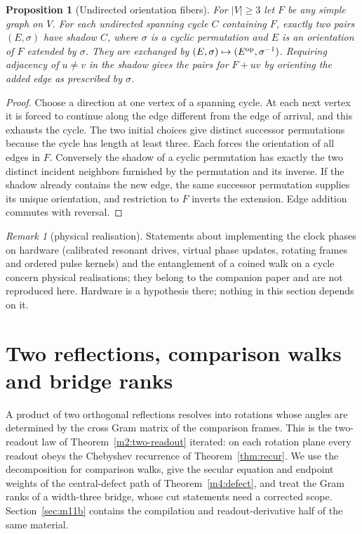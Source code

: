 \documentclass[11pt,reqno]{amsart}
\newtheorem{proposition}[theorem]{Proposition}
\theoremstyle{definition}
\theoremstyle{remark}
\newtheorem{remark}[theorem]{Remark}
\numberwithin{equation}{section}
\begin{document}
\begin{proposition}[Undirected orientation fibers]\label{m4:orientation}
For $|V|\ge3$ let $F$ be any simple graph on $V$. For each undirected spanning cycle $C$ containing $F$, exactly two pairs $(E,\sigma)$ have shadow $C$, where $\sigma$ is a cyclic permutation and $E$ is an orientation of $F$ extended by $\sigma$. They are exchanged by $(E,\sigma)\mapsto(E^{\rm op},\sigma^{-1})$. Requiring adjacency of $u\ne v$ in the shadow gives the pairs for $F+uv$ by orienting the added edge as prescribed by $\sigma$.
\end{proposition}
\begin{proof}
Choose a direction at one vertex of a spanning cycle. At each next vertex it is forced to continue along the edge different from the edge of arrival, and this exhausts the cycle. The two initial choices give distinct successor permutations because the cycle has length at least three. Each forces the orientation of all edges in $F$. Conversely the shadow of a cyclic permutation has exactly the two distinct incident neighbors furnished by the permutation and its inverse. If the shadow already contains the new edge, the same successor permutation supplies its unique orientation, and restriction to $F$ inverts the extension. Edge addition commutes with reversal.
\end{proof}


\begin{remark}[physical realisation]\label{m4:physical}
Statements about implementing the clock phases on hardware (calibrated resonant drives, virtual phase updates, rotating frames and
ordered pulse kernels) and the entanglement of a coined walk on a cycle concern physical realisations; they belong to the companion
paper and are not reproduced here.  Hardware is a hypothesis there; nothing in this section depends on it.
\end{remark}

\section{Two reflections, comparison walks and bridge ranks}\label{sec:m11}

A product of two orthogonal reflections resolves into rotations whose angles
are determined by the cross Gram matrix of the comparison frames. This is the
two-readout law of Theorem~\ref{m2:two-readout} iterated: on each rotation
plane every readout obeys the Chebyshev recurrence of Theorem~\ref{thm:recur}.
We use the decomposition for comparison walks, give the secular equation and
endpoint weights of the central-defect path of Theorem~\ref{m4:defect}, and
treat the Gram ranks of a width-three bridge, whose cut statements need a
corrected scope. Section~\ref{sec:m11b} contains the compilation and
readout-derivative half of the same material.
\end{document}
